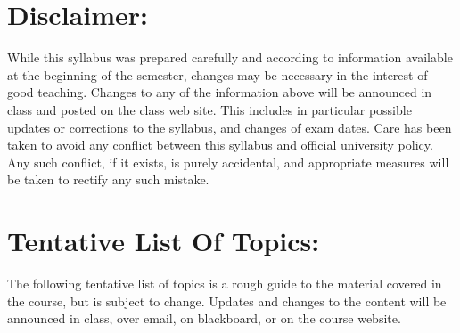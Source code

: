 \documentclass[margin]{res}
\theoremstyle{plain}
\theoremstyle{definition}
\theoremstyle{remark}
\begin{document}
\begin{resume}
\section{Disclaimer:} 
While this syllabus was prepared carefully and according to information
available at the beginning of the semester, changes may be necessary in the
interest of good teaching. Changes to any of the information above will
be announced in class and posted on the class web site. This includes in
particular possible updates or corrections to the syllabus, and changes of
exam dates. Care has been taken to avoid any conflict between this syllabus and official university policy. Any such conflict, if it exists, is purely accidental, and appropriate measures will be taken to rectify any such mistake. 


\section{Tentative List Of Topics:} The following tentative list of topics is a rough guide to the material covered in the course, but is subject to change. Updates and changes to the content will be announced in class, over email, on blackboard, or on the course website.


\end{resume}
\end{document}
